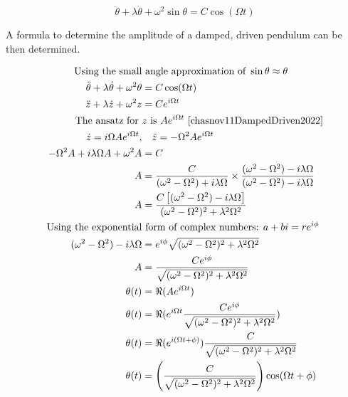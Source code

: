 \documentclass[letterpaper, 12pt]{article}
\begin{document}
\endgroup
\begin{equation} \label{eq:noApproximate}
    \ddot\theta + \lambda\dot\theta + \omega^2\sin\theta = C\cos(\Omega t)
\end{equation}

A formula to determine the amplitude of a damped, driven pendulum
can be then determined.

\begingroup
\allowdisplaybreaks
\begin{align*}
    \text{Using the small}                           & \text{ angle approximation of }    \sin\theta \approx \theta
    \\
    \ddot\theta + \lambda\dot\theta + \omega^2\theta & = C\cos(\Omega t)
    \\
    \ddot z + \lambda\dot z + \omega^2 z             & = Ce^{i\Omega t}
    \\
    \text{The ansatz for }                           & z \text{ is } Ae^{i\Omega t} ~\text{\cite{chasnov11DampedDriven2022}}
    \\
    \dot z = i\Omega Ae^{i\Omega t},                 & \quad \ddot z = -\Omega^2 Ae^{i\Omega t}
    \\
    -\Omega^2 A + i\lambda\Omega A + \omega^2 A      & = C
    \\
    A                                                & = \frac{C}{(\omega^2 - \Omega^2) + i\lambda\Omega} \times \frac{(\omega^2 - \Omega^2) - i\lambda\Omega}{(\omega^2 - \Omega^2) - i\lambda\Omega}
    \\
    A                                                & = \frac{C\left[ (\omega^2 - \Omega^2) - i\lambda\Omega \right]}{(\omega^2 - \Omega^2)^2 + \lambda^2\Omega^2}
    \\
    \text{Using the exponential}                     & \text{ form of complex numbers: } a + bi = re^{i\phi}
    \\
    (\omega^2 - \Omega^2) - i\lambda\Omega           & = e^{i\phi} \sqrt{(\omega^2 - \Omega^2)^2 + \lambda^2\Omega^2}
    \\
    A                                                & = \frac{Ce^{i\phi}}{\sqrt{(\omega^2 - \Omega^2)^2 + \lambda^2\Omega^2}}
    \\
    \theta (t)                                       & = \Re (Ae^{i\Omega t})
    \\
    \theta (t)                                       & = \Re (e^{i\Omega t} \frac{Ce^{i\phi}}{\sqrt{(\omega^2 - \Omega^2)^2 + \lambda^2\Omega^2}})
    \\
    \theta (t)                                       & = \Re (e^{i(\Omega t + \phi)}) \frac{C}{\sqrt{(\omega^2 - \Omega^2)^2 + \lambda^2\Omega^2}}
    \\
    \theta (t)                                       & = \left(\frac{C}{\sqrt{(\omega^2 - \Omega^2)^2 + \lambda^2\Omega^2}}\right) \cos(\Omega t + \phi)
\end{align*}
\endgroup
\end{document}
